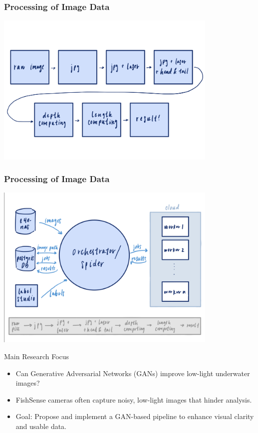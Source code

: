 \begin{frame}
    \frametitle{Processing of Image Data}

    \centering
    \includegraphics[width=0.8\textwidth, keepaspectratio]{images/flow1.png}
\end{frame}

\begin{frame}
    \frametitle{Processing of Image Data}

    \centering
    \includegraphics[width=0.8\textwidth, keepaspectratio]{images/flow2.png}
\end{frame}

\begin{frame}{Main Research Focus}
    \begin{itemize}
        \item Can Generative Adversarial Networks (GANs) improve low-light underwater images?
        \item  FishSense cameras often capture noisy, low-light images that hinder analysis.
        \item Goal: Propose and implement a GAN-based pipeline to enhance visual clarity and usable data.
    \end{itemize}
\end{frame}

